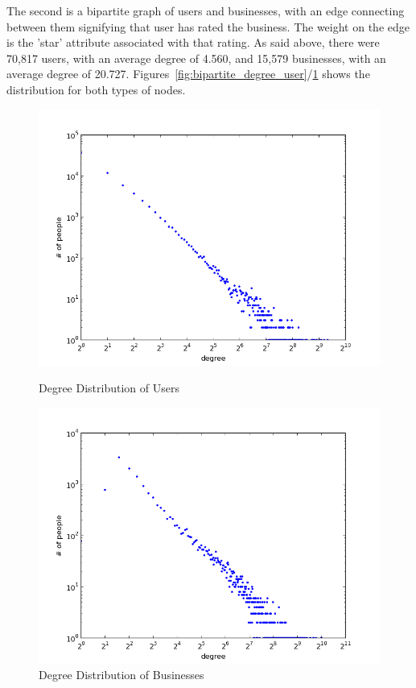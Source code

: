 \documentclass[10pt]{article}
\begin{document}
The second is a bipartite graph of users and businesses, with an edge connecting between them signifying that user has rated the business.  The weight on the edge is the 'star' attribute associated with that rating.  As said above, there were 70,817 users, with an average degree of 4.560, and 15,579 businesses, with an average degree of 20.727. Figures~\ref{fig:bipartite_degree_user}/\ref{fig:bipartite_degree_biz} shows the distribution for both types of nodes.

\begin{figure}[ht]
\includegraphics[scale=.4]{user_degree_distribution.png} 
\caption{Degree Distribution of Users}
\label{fig:bipartite_degree_user}
\endminipage\hfill
{}
\includegraphics[scale=.4]{biz_degree_distribution.png}
\caption{Degree Distribution of Businesses}
\label{fig:bipartite_degree_biz}
\endminipage\hfill
\end{figure}
\end{document}
